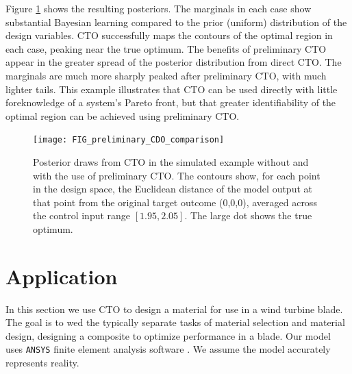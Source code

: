 \documentclass[12pt]{article}
\begin{document}
%
Figure \ref{fig:toy_sim_results} shows the resulting posteriors. %
%
The marginals in each case show substantial Bayesian learning compared to the prior (uniform) distribution of the design variables. 
%
CTO successfully maps the contours of the optimal region in each case, peaking near the true optimum. 
%
The benefits of preliminary CTO appear in the greater spread of the posterior distribution from direct CTO.
%
The marginals are much more sharply peaked after preliminary CTO, with much lighter tails.
%
%
%
This example illustrates that CTO can be used directly with little foreknowledge of a system's Pareto front, but that greater identifiability of the optimal region can be achieved using preliminary CTO.

\begin{figure}
\centering
\texttt{[image: FIG\_preliminary\_CDO\_comparison]}
\caption{Posterior draws from CTO in the simulated example without and with the use of preliminary CTO. The contours show, for each point in the design space, the Euclidean distance of the model output at that point from the original target outcome (0,0,0), averaged across the control input range $[1.95,2.05]$. The large dot shows the true optimum.}
\label{fig:toy_sim_results}
\end{figure}



\section{Application}\label{application}

In this section we use CTO to design a material for use in a wind turbine blade. %
%
The goal is to wed the typically separate tasks of material selection and material design, designing a composite to optimize performance in a blade.
%
Our model uses \texttt{ANSYS} finite element analysis software \citep{ansys}. 
We assume the model accurately represents reality.
\end{document}

